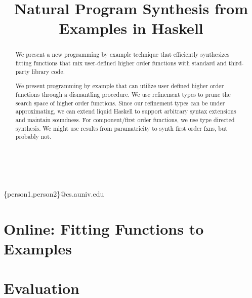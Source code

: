 \documentclass[pldi]{sigplanconf-pldi16}
\begin{document}
\title{Natural Program Synthesis from Examples in Haskell}

%
%

{ \\
  \\
}
{\{person1,person2\}@cs.auniv.edu}



\maketitle

\begin{abstract}
We present a new programming by example technique that efficiently synthesizes fitting functions that mix user-defined higher order functions with standard and third-party library code.

We present programming by example that can utilize user defined higher order functions through a dismantling procedure. We use refinement types to prune the search space of higher order functions. Since our refinement types can be under approximating, we can extend liquid Haskell to support arbitrary syntax extensions and maintain soundness. For component/first order functions, we use type directed synthesis. We might use results from paramatricity to synth first order fxns, but probably not.
\end{abstract}













\section{Online: Fitting Functions to Examples} \label{synth}


\section{Evaluation}\label{evaluation}








\end{document}
